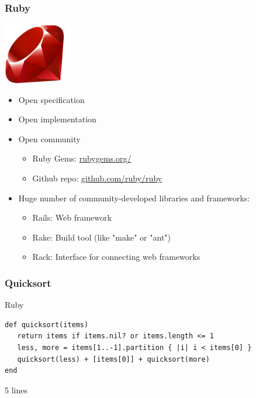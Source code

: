 \documentclass{beamer}
\begin{document}
\begin{frame}
  \frametitle{Ruby}
  \begin{center} 
    \includegraphics[width=0.2\textwidth]{../img/ruby}

    \begin{itemize}
    \item Open specification
    \item Open implementation
    \item Open community
      \begin{itemize}
      \item Ruby Gems: \href{http://rubygems.org/}{rubygems.org/}
      \item Github repo: \href{https://github.com/ruby/ruby}{github.com/ruby/ruby}
      \end{itemize}
    \item Huge number of community-developed libraries and frameworks:
      \begin{itemize}
      \item Rails: Web framework
      \item Rake: Build tool (like "make" or "ant")
      \item Rack: Interface for connecting web frameworks
      \end{itemize}
    \end{itemize}
  \end{center}
\end{frame}

\begin{frame}[fragile]
  \frametitle{Quicksort}
  \begin{block}{Ruby}


    \begin{footnotesize}
\begin{verbatim}
def quicksort(items)
   return items if items.nil? or items.length <= 1
   less, more = items[1..-1].partition { |i| i < items[0] }
   quicksort(less) + [items[0]] + quicksort(more)
end
\end{verbatim}
    \end{footnotesize}
  \end{block}

  \vspace{2em}

  5 lines


\end{frame}
\end{document}
